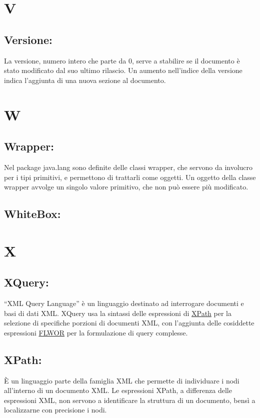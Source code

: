 \chapter{V}
\section{Versione:}
La versione, numero intero che parte da 0, serve a stabilire se il documento \`e stato modificato dal suo ultimo rilascio. Un aumento nell'indice della versione indica l'aggiunta di una nuova sezione al documento.

\chapter{W}
\hypertarget{wrapper}{}
\section{Wrapper:}
Nel package java.lang sono definite delle classi wrapper, che servono da involucro per i tipi primitivi, e permettono di trattarli come oggetti. Un oggetto della classe wrapper avvolge un singolo valore primitivo, che non pu\`o essere pi\`u modificato.
\section{WhiteBox:}


\chapter{X}
\hypertarget{XQuery}{}
\section{XQuery:}
``XML Query Language'' \`e un linguaggio destinato ad interrogare documenti e basi di dati XML.
XQuery usa la sintassi delle espressioni di \hyperlink{XPath}{XPath} per la selezione di specifiche porzioni di documenti XML, con l'aggiunta delle cosiddette espressioni \hyperlink{FLWOR}{FLWOR} per la formulazione di query complesse.
\hypertarget{XPath}{}
\section{XPath:}
\`E un linguaggio parte della famiglia XML che permette di individuare i nodi all'interno di un documento XML. Le espressioni XPath, a differenza delle espressioni XML, non servono a identificare la struttura di un documento, bens\`i a localizzarne con precisione i nodi.



